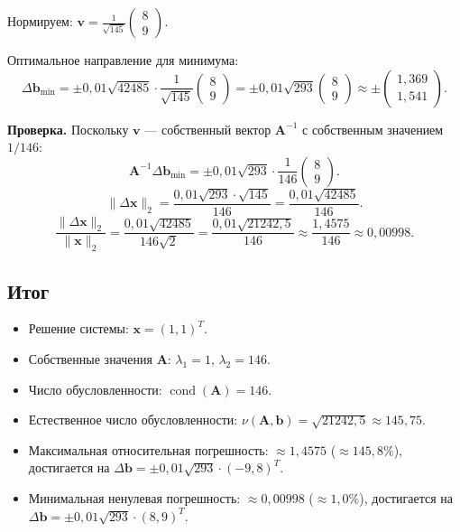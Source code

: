 \documentclass{article}
\begin{document}
Нормируем: $\mathbf{v} = \frac{1}{\sqrt{145}} \begin{pmatrix} 8 \\ 9 \end{pmatrix}$.

Оптимальное направление для минимума:
\begin{equation}
\Delta\mathbf{b}_{\min} = \pm 0{,}01\sqrt{42485} \cdot \frac{1}{\sqrt{145}} \begin{pmatrix} 8 \\ 9 \end{pmatrix} = \pm 0{,}01\sqrt{293} \begin{pmatrix} 8 \\ 9 \end{pmatrix} \approx \pm \begin{pmatrix} 1{,}369 \\ 1{,}541 \end{pmatrix}.
\end{equation}

\textbf{Проверка.} Поскольку $\mathbf{v}$ --- собственный вектор $\mathbf{A}^{-1}$ с собственным значением $1/146$:
\begin{equation}
\mathbf{A}^{-1}\Delta\mathbf{b}_{\min} = \pm 0{,}01\sqrt{293} \cdot \frac{1}{146} \begin{pmatrix} 8 \\ 9 \end{pmatrix}.
\end{equation}
\begin{equation}
\|\Delta\mathbf{x}\|_2 = \frac{0{,}01\sqrt{293} \cdot \sqrt{145}}{146} = \frac{0{,}01\sqrt{42485}}{146}.
\end{equation}
\begin{equation}
\frac{\|\Delta\mathbf{x}\|_2}{\|\mathbf{x}\|_2} = \frac{0{,}01\sqrt{42485}}{146\sqrt{2}} = \frac{0{,}01\sqrt{21242{,}5}}{146} \approx \frac{1{,}4575}{146} \approx 0{,}00998.
\end{equation}

\subsection*{Итог}

\begin{itemize}
    \item Решение системы: $\mathbf{x} = (1, 1)^T$.
    \item Собственные значения $\mathbf{A}$: $\lambda_1 = 1$, $\lambda_2 = 146$.
    \item Число обусловленности: $\operatorname{cond}(\mathbf{A}) = 146$.
    \item Естественное число обусловленности: $\nu(\mathbf{A}, \mathbf{b}) = \sqrt{21242{,}5} \approx 145{,}75$.
    \item Максимальная относительная погрешность: $\approx 1{,}4575$ ($\approx 145{,}8\%$), достигается на $\Delta\mathbf{b} = \pm 0{,}01\sqrt{293} \cdot (-9, 8)^T$.
    \item Минимальная ненулевая погрешность: $\approx 0{,}00998$ ($\approx 1{,}0\%$), достигается на $\Delta\mathbf{b} = \pm 0{,}01\sqrt{293} \cdot (8, 9)^T$.
\end{itemize}
\end{document}
